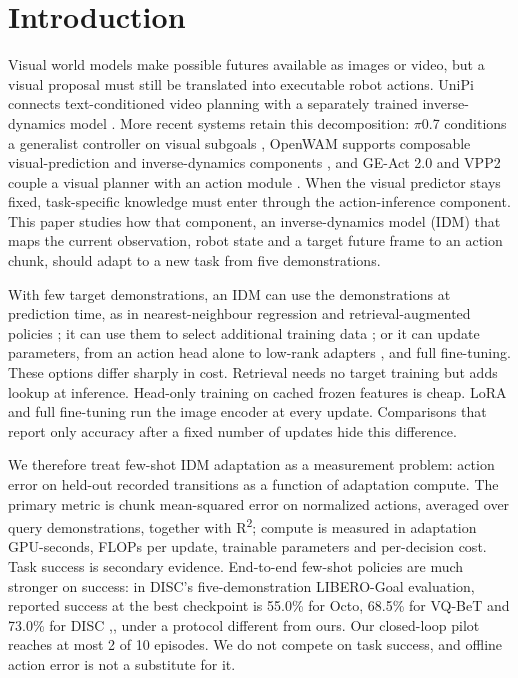 \documentclass[11pt,a4paper]{article}
\begin{document}
\section{Introduction}

Visual world models make possible futures available as images or video, but a visual proposal must still be translated into executable robot actions. UniPi connects text-conditioned video planning with a separately trained inverse-dynamics model \cite{ref1}. More recent systems retain this decomposition: \ensuremath{\pi}0.7 conditions a generalist controller on visual subgoals \cite{ref2}, OpenWAM supports composable visual-prediction and inverse-dynamics components \cite{ref3}, and GE-Act 2.0 and VPP2 couple a visual planner with an action module \cite{ref4,ref5}. When the visual predictor stays fixed, task-specific knowledge must enter through the action-inference component. This paper studies how that component, an inverse-dynamics model (IDM) that maps the current observation, robot state and a target future frame to an action chunk, should adapt to a new task from five demonstrations.

With few target demonstrations, an IDM can use the demonstrations at prediction time, as in nearest-neighbour regression and retrieval-augmented policies \cite{ref6,ref7}; it can use them to select additional training data \cite{ref8,ref9}; or it can update parameters, from an action head alone to low-rank adapters \cite{ref10,ref11},\cite{ref12} and full fine-tuning. These options differ sharply in cost. Retrieval needs no target training but adds lookup at inference. Head-only training on cached frozen features is cheap. LoRA and full fine-tuning run the image encoder at every update. Comparisons that report only accuracy after a fixed number of updates hide this difference.

We therefore treat few-shot IDM adaptation as a measurement problem: action error on held-out recorded transitions as a function of adaptation compute. The primary metric is chunk mean-squared error on normalized actions, averaged over query demonstrations, together with R\textsuperscript{2}; compute is measured in adaptation GPU-seconds, FLOPs per update, trainable parameters and per-decision cost. Task success is secondary evidence. End-to-end few-shot policies are much stronger on success: in DISC's five-demonstration LIBERO-Goal evaluation, reported success at the best checkpoint is 55.0\% for Octo, 68.5\% for VQ-BeT and 73.0\% for DISC \cite{ref13,ref14},\cite{ref15}, under a protocol different from ours. Our closed-loop pilot reaches at most 2 of 10 episodes. We do not compete on task success, and offline action error is not a substitute for it.
\end{document}
